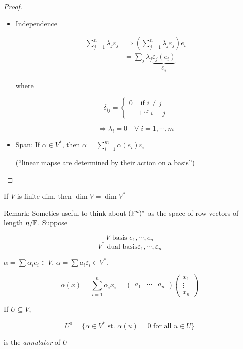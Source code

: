 \documentclass[a4paper]{article}
\begin{document}
\begin{proof}
\begin{itemize}
	\item Independence
	
	\begin{align*}
	\sum_{j=1}^{n} \lambda_{j} \varepsilon_{j} & \Rightarrow \left(  \sum_{j=1}^{n}  \lambda_{j} \varepsilon_{j} \right) e_{i}   \\
	& = \sum_{j} \lambda_{j} \underbrace{\varepsilon_{j} (e_{i})}_{\delta_{ij}} 
	\end{align*}
	
	where 
	
	\[ \delta_{ij} = \begin{cases} 0  & \text{ if } i \neq j \\ & 1 \text{ if } i = j\end{cases} \]
	
	
	\[ \Rightarrow  \lambda_{i} = 0 \quad \forall \; i = 1,\cdots,m \]
	
	\item Span: If $ \alpha \in V^{*} $, then $ \alpha = \sum_{i=1}^{m} \alpha(e_{i}) \varepsilon_{i} $
	
	(``linear mapse are determined by their action on a basis'')
	
\end{itemize}
\end{proof}

\begin{cor} 
	If $ V $ is finite dim, then $ \dim V  = \dim V^{*} $
\end{cor}
 
 
 Remark: Someties useful to think about $ (\mathbb{F}^{n})^{*} $ as the space of row vectors of length $ n / \mathbb{F} $. Suppose
 
 \[ V \text{ basis } e_{1},\cdots,e_{n}\]
 \[ V^{*} \text{ dual basis} \varepsilon_{1},\cdots,\varepsilon_{n} \]
 
 $ \alpha = \sum \alpha_{i} e_{i} \in V $, $ \alpha = \sum a_{i} \varepsilon_{i} \in V^{*} $.
 
 \[ \alpha(x) = \sum_{i=1}^{n} \alpha_{i} x_{i} =   \begin{pmatrix}
 a_{1} & \cdots & a_{n}
 \end{pmatrix}  \begin{pmatrix}
 x_{1} \\
 \vdots \\
 x_{n}
 \end{pmatrix}  \]
 
 
 \begin{defi}
 	If $ U \subseteq V $, 
 	
 	\[ U^{0} = \{  \alpha \in V^{*} \text{ st. } \alpha(u) = 0 \text{ for all }  u  \in U \} \] 
 	
 	is the \emph{annulator} of $ U $
 	
 \end{defi}
\end{document}
